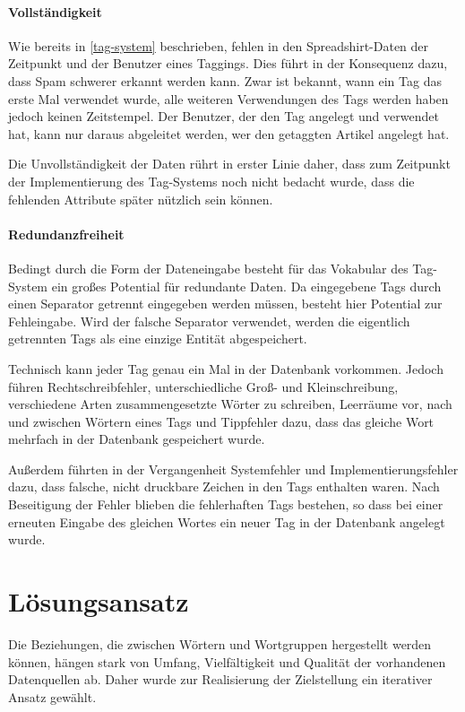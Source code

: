 \paragraph{Vollständigkeit}

Wie bereits in \ref{tag-system} beschrieben, fehlen in den Spreadshirt-Daten der Zeitpunkt und der Benutzer eines Taggings. Dies führt in der Konsequenz dazu, dass Spam schwerer erkannt werden kann. Zwar ist bekannt, wann ein Tag das erste Mal verwendet wurde, alle weiteren Verwendungen des Tags werden haben jedoch keinen Zeitstempel. Der Benutzer, der den Tag angelegt und verwendet hat, kann nur daraus abgeleitet werden, wer den getaggten Artikel angelegt hat.

Die Unvollständigkeit der Daten rührt in erster Linie daher, dass zum Zeitpunkt der Implementierung des Tag-Systems noch nicht bedacht wurde, dass die fehlenden Attribute später nützlich sein können.

\paragraph{Redundanzfreiheit}

Bedingt durch die Form der Dateneingabe besteht für das Vokabular des Tag-System ein großes Potential für redundante Daten. Da eingegebene Tags durch einen Separator getrennt eingegeben werden müssen, besteht hier Potential zur Fehleingabe. Wird der falsche Separator verwendet, werden die eigentlich getrennten Tags als eine einzige Entität abgespeichert.

Technisch kann jeder Tag genau ein Mal in der Datenbank vorkommen. Jedoch führen Rechtschreibfehler, unterschiedliche Groß- und Kleinschreibung, verschiedene Arten zusammengesetzte Wörter zu schreiben, Leerräume vor, nach und zwischen Wörtern eines Tags und Tippfehler dazu, dass das gleiche Wort mehrfach in der Datenbank gespeichert wurde.

Außerdem führten in der Vergangenheit Systemfehler und Implementierungsfehler dazu, dass falsche, nicht druckbare Zeichen in den Tags enthalten waren. Nach Beseitigung der Fehler blieben die fehlerhaften Tags bestehen, so dass bei einer erneuten Eingabe des gleichen Wortes ein neuer Tag in der Datenbank angelegt wurde.

\section{Lösungsansatz}

Die Beziehungen, die zwischen Wörtern und Wortgruppen hergestellt werden können, hängen stark von Umfang, Vielfältigkeit und Qualität der vorhandenen Datenquellen ab. Daher wurde zur Realisierung der Zielstellung ein iterativer Ansatz gewählt.

